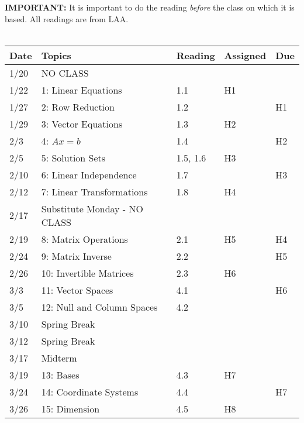 \documentclass[11pt]{article}
\begin{document}
\textbf{IMPORTANT:} It is important to do the reading \emph{before} the class on
which it is based.   All readings are from LAA.
\\~\\
\small
\begin{centering}
\begin{tabular}{||l|p{3in}|l|l|l||}
\hline\hline
Date & Topics  & Reading & Assigned & Due  \\
\hline\hline
1/20 & NO CLASS &&& \\
1/22 & 1: Linear Equations & 1.1 & H1  & \\
\hline

1/27 & 2: Row Reduction & 1.2 & & H1 \\
1/29 & 3: Vector Equations & 1.3 & H2 & \\
\hline

2/3 & 4: $Ax = b$ & 1.4 & & H2 \\
2/5 & 5: Solution Sets & 1.5, 1.6 & H3 & \\
\hline

2/10 & 6: Linear Independence & 1.7 & & H3 \\
2/12 & 7: Linear Transformations & 1.8 & H4 & \\
\hline

2/17 & Substitute Monday - NO CLASS & & &\\
2/19 & 8: Matrix Operations  & 2.1 & H5 & H4 \\
\hline

2/24 & 9: Matrix Inverse & 2.2 & & H5\\
2/26 & 10: Invertible Matrices & 2.3 & H6 &\\
\hline

3/3 & 11: Vector Spaces & 4.1 & & H6\\
3/5 & 12: Null and Column Spaces & 4.2 & &\\
\hline

3/10 & Spring Break &&&\\
3/12 & Spring Break &&&\\
\hline

3/17 & Midterm & & &\\
3/19 & 13: Bases & 4.3 & H7 &\\
\hline

3/24 & 14: Coordinate Systems & 4.4 & & H7\\
3/26 & 15: Dimension & 4.5 & H8 &\\
\hline


\end{tabular}
\end{centering}
\end{document}
